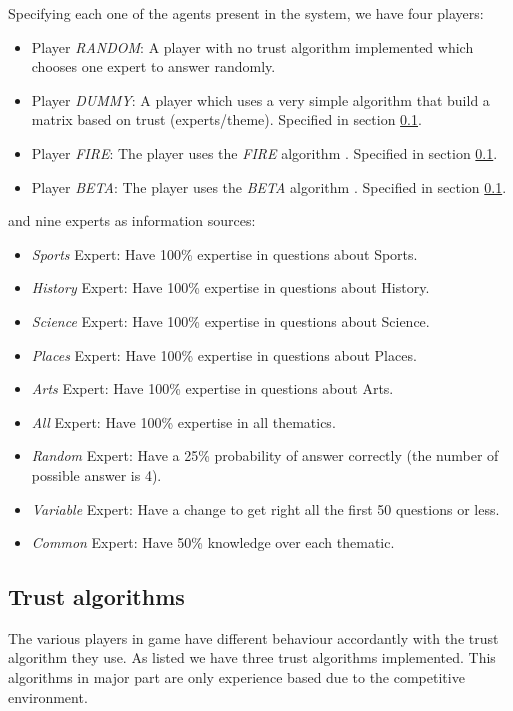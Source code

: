 \documentclass{llncs}
\begin{document}
Specifying each one of the agents present in the system, we have four players: 
\begin{itemize}
\item Player \textit{RANDOM}: A player with no trust algorithm implemented which chooses one expert to answer randomly. 
\item Player \textit{DUMMY}: A player which uses a very simple algorithm that build a matrix based on trust (experts/theme). Specified in section \ref{Trust}.
\item Player \textit{FIRE}: The player uses the \textit{FIRE} algorithm \cite{Fire}. Specified in section \ref{Trust}.
\item Player \textit{BETA}: The player uses the \textit{BETA} algorithm \cite{Beta}. Specified in section \ref{Trust}.
\end{itemize}
and nine experts as information sources:
\begin{itemize}
\item \textit{Sports} Expert: Have 100\% expertise in questions about Sports.
\item \textit{History} Expert: Have 100\% expertise in questions about History.
\item \textit{Science} Expert: Have 100\% expertise in questions about Science.
\item \textit{Places} Expert: Have 100\% expertise in questions about Places.
\item \textit{Arts} Expert: Have 100\% expertise in questions about Arts.
\item \textit{All} Expert: Have 100\% expertise in all thematics.
\item \textit{Random} Expert: Have a 25\% probability of answer correctly (the number of possible answer is 4).
\item \textit{Variable} Expert: Have a change to get right all the first 50 questions or less.
\item \textit{Common} Expert: Have 50\% knowledge over each thematic.
\end{itemize}

\subsection{Trust algorithms}\label{Trust}

The various players in game have different behaviour accordantly with the trust algorithm they use. As listed we have three trust algorithms implemented. This algorithms in major part are only experience based due to the competitive environment.
\end{document}
